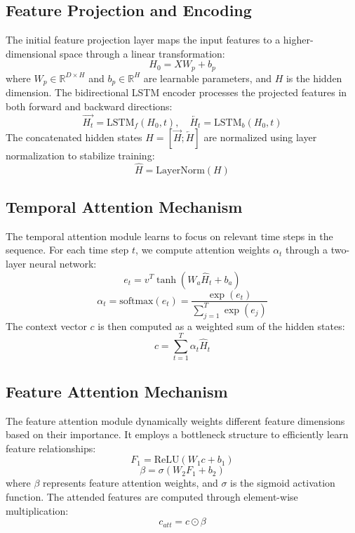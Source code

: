 \documentclass[10pt,twocolumn,letterpaper]{article}
\begin{document}
\subsection{Feature Projection and Encoding}
The initial feature projection layer maps the input features to a higher-dimensional space through a linear transformation:
\begin{equation}
	H_0 = XW_p + b_p
\end{equation}
where $W_p \in \mathbb{R}^{D \times H}$ and $b_p \in \mathbb{R}^{H}$ are learnable parameters, and $H$ is the hidden dimension.
The bidirectional LSTM encoder processes the projected features in both forward and backward directions:
\begin{equation}
	\overrightarrow{H_t} = \text{LSTM}_f(H_0, t), \quad \overleftarrow{H_t} = \text{LSTM}_b(H_0, t)
\end{equation}
The concatenated hidden states $H = [\overrightarrow{H}; \overleftarrow{H}]$ are normalized using layer normalization to stabilize training:
\begin{equation}
	\hat{H} = \text{LayerNorm}(H)
\end{equation}
\subsection{Temporal Attention Mechanism}
The temporal attention module learns to focus on relevant time steps in the sequence. For each time step $t$, we compute attention weights $\alpha_t$ through a two-layer neural network:
\begin{equation}
	e_t = v^T\tanh(W_a\hat{H}_t + b_a)
\end{equation}
\begin{equation}
	\alpha_t = \text{softmax}(e_t) = \frac{\exp(e_t)}{\sum_{j=1}^T \exp(e_j)}
\end{equation}
The context vector $c$ is then computed as a weighted sum of the hidden states:
\begin{equation}
	c = \sum_{t=1}^T \alpha_t\hat{H}_t
\end{equation}
\subsection{Feature Attention Mechanism}
The feature attention module dynamically weights different feature dimensions based on their importance. It employs a bottleneck structure to efficiently learn feature relationships:
\begin{equation}
	F_1 = \text{ReLU}(W_1c + b_1)
\end{equation}
\begin{equation}
	\beta = \sigma(W_2F_1 + b_2)
\end{equation}
where $\beta$ represents feature attention weights, and $\sigma$ is the sigmoid activation function. The attended features are computed through element-wise multiplication:
\begin{equation}
	c_{att} = c \odot \beta
\end{equation}
\end{document}

